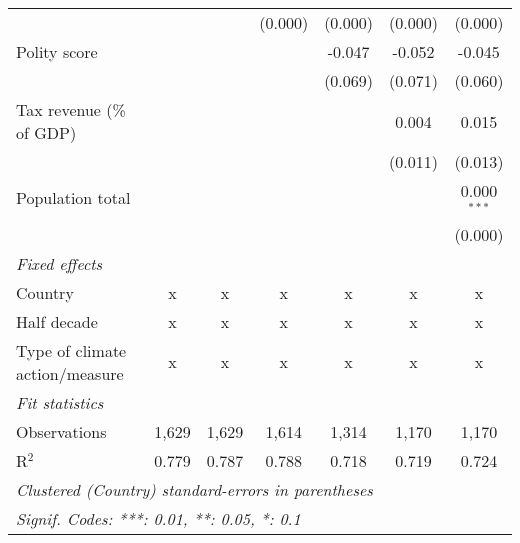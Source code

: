 \begin{tabular}{lcccccc}
                                                                              &              &                & (0.000)        & (0.000)       & (0.000)       & (0.000)\\   
   Polity score                                                               &              &                &                & -0.047        & -0.052        & -0.045\\   
                                                                              &              &                &                & (0.069)       & (0.071)       & (0.060)\\   
   Tax revenue (\% of GDP)                                                    &              &                &                &               & 0.004         & 0.015\\   
                                                                              &              &                &                &               & (0.011)       & (0.013)\\   
   Population total                                                           &              &                &                &               &               & 0.000$^{***}$\\   
                                                                              &              &                &                &               &               & (0.000)\\   
   \emph{Fixed effects}\\
   Country                                                                    & x            & x              & x              & x             & x             & x\\  
   Half decade                                                                & x            & x              & x              & x             & x             & x\\  
   Type of climate action/measure                                             & x            & x              & x              & x             & x             & x\\  
   \midrule \emph{Fit statistics}\\
   Observations                                                               & 1,629        & 1,629          & 1,614          & 1,314         & 1,170         & 1,170\\  
   R$^2$                                                                      & 0.779        & 0.787          & 0.788          & 0.718         & 0.719         & 0.724\\  
   \midrule
   \multicolumn{7}{l}{\emph{Clustered (Country) standard-errors in parentheses}}\\
   \multicolumn{7}{l}{\emph{Signif. Codes: ***: 0.01, **: 0.05, *: 0.1}}\\
\end{tabular}
\par\endgroup


